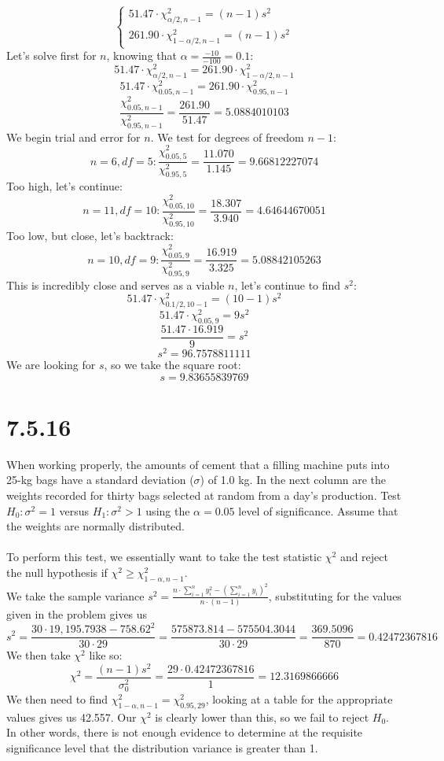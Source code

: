 \documentclass{article}
\begin{document}
{\begin{equation*}
\begin{cases}
51.47 \cdot \chi^2_{\alpha / 2, n-1} = (n-1)s^2 \\
261.90 \cdot \chi^2_{1 - \alpha / 2, n-1} = (n-1)s^2
\end{cases}
\end{equation*}
Let's solve first for \(n\), knowing that \(\alpha = \frac{-10}{-100} = 0.1\):
\[
51.47 \cdot \chi^2_{\alpha / 2, n-1} = 261.90 \cdot \chi^2_{1 - \alpha / 2, n-1}
\]
\[
51.47 \cdot \chi^2_{0.05, n-1} = 261.90 \cdot \chi^2_{0.95, n-1}
\]
\[
\frac{\chi^2_{0.05, n-1}}{\chi^2_{0.95, n-1}} = \frac{261.90}{51.47} = 5.0884010103
\]
We begin trial and error for \(n\). We test for degrees of freedom \(n-1\):
\[
n = 6, df = 5: \frac{\chi^2_{0.05, 5}}{\chi^2_{0.95, 5}} = \frac{11.070}{1.145} = 9.66812227074
\]
Too high, let's continue:
\[
n = 11, df = 10: \frac{\chi^2_{0.05, 10}}{\chi^2_{0.95, 10}} = \frac{18.307}{3.940} = 4.64644670051
\]
Too low, but close, let's backtrack:
\[
n = 10, df = 9: \frac{\chi^2_{0.05, 9}}{\chi^2_{0.95, 9}} = \frac{16.919}{3.325} = 5.08842105263
\]
This is incredibly close and serves as a viable \(n\), let's continue to find \(s^2\):
\[
51.47 \cdot \chi^2_{0.1 / 2, 10 - 1} = (10 - 1)s^2
\]
\[
51.47 \cdot \chi^2_{0.05, 9} = 9s^2
\]
\[
\frac{51.47 \cdot 16.919}{9} = s^2
\]
\[
s^2 = 96.7578811111
\]
We are looking for \(s\), so we take the square root:
\[
s = 9.83655839769
\]

\section*{7.5.16}

When working properly, the amounts of cement
that a filling machine puts into 25-kg bags have a standard deviation (\(\sigma\)) of 1.0 kg. In the next column are the weights recorded for thirty bags selected at random from a day's production. Test \(H_0: \sigma^2 = 1 \) versus \(H_1: \sigma^2 > 1\) using the \(\alpha = 0.05\) level of significance. Assume that the weights are normally distributed.
\\
\\
To perform this test, we essentially want to take the test statistic \(\chi^2\) and reject the null hypothesis if \(\chi^2 \geq \chi^2_{1-\alpha, n-1}\). 
\\
We take the sample variance \(s^2 = \frac{n \cdot \sum_{i=1}^{n} y_i^2 - (\sum_{i=1}^{n}y_i)^2}{n \cdot (n-1)}\), substituting for the values given in the problem gives us 
\[
s^2 = \frac{30 \cdot 19,195.7938 - 758.62^2}{30 \cdot 29} = \frac{575873.814 - 575504.3044}{30 \cdot 29} = \frac{369.5096}{870} = 0.42472367816
\]
We then take \(\chi^2\) like so:
\[
\chi^2 = \frac{(n-1)s^2}{\sigma_0^2} = \frac{29 \cdot 0.42472367816}{1} = 12.3169866666
\]
We then need to find \(\chi^2_{1-\alpha, n-1} = \chi^2_{0.95, 29} \), looking at a table for the appropriate values gives us 42.557. Our \(\chi^2\) is clearly lower than this, so we fail to reject \(H_0\). In other words, there is not enough evidence to determine at the requisite significance level that the distribution variance is greater than 1.

}
\end{document}
